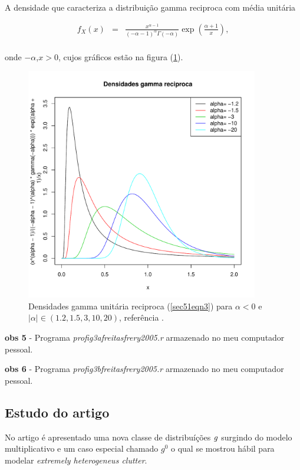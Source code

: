 \documentclass[12pt,a4paper]{article}
\begin{document}
A densidade que caracteriza a distribuição gamma reciproca com média unitária

\begin{equation}\label{sec51eqn3}
\begin{array}{ccc}
	f_{X}(x)&=&\frac{x^{\alpha-1}}{(-\alpha-1)^{\alpha}\Gamma(-\alpha)}\exp\left(\frac{\alpha+1}{x}\right), \\
\end{array}
\end{equation}

onde $-\alpha$,$x>0$, cujos gráficos estão na figura (\ref{sec51fig5}).

\begin{figure}[!htb]
\centering
\includegraphics[width=4.0in]{fig3b_freitas_frery_2005.pdf}
	\caption{Densidades gamma unitária reciproca (\ref{sec51eqn3}) para $\alpha < 0$ e $|\alpha|\in(1.2,1.5,3,10,20)$, referência \cite{freitas_frery_2005} .}
\label{sec51fig5}
\end{figure}

{\bf obs 5} - Programa {\it profig3afreitasfrery2005.r} armazenado no meu computador pessoal.

{\bf obs 6} - Programa {\it profig3bfreitasfrery2005.r} armazenado no meu computador pessoal.

\subsection{Estudo do artigo  \cite{frery_muller_1997}}

No artigo é apresentado uma nova classe de distribuíções ${\it g}$ surgindo do modelo multiplicativo e um caso especial chamado {\it $g^{0}$} o qual se mostrou hábil para modelar  {\it extremely heterogeneus clutter}.
\end{document}

